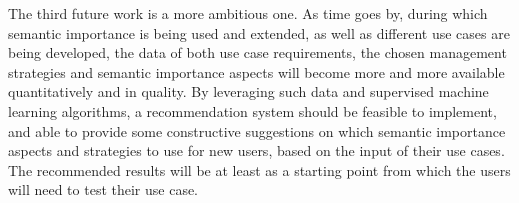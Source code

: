 The third future work is a more ambitious one.
As time goes by, during which semantic importance is being used and extended, as well as different use cases are being developed, the data of both use case requirements, the chosen management strategies and semantic importance aspects will become more and more available quantitatively and in quality.
By leveraging such data and supervised machine learning algorithms, a recommendation system should be feasible to implement, and able to provide some constructive suggestions on which semantic importance aspects and strategies to use for new users, based on the input of their use cases. 
The recommended results will be at least as a starting point from which the users will need to test their use case. 